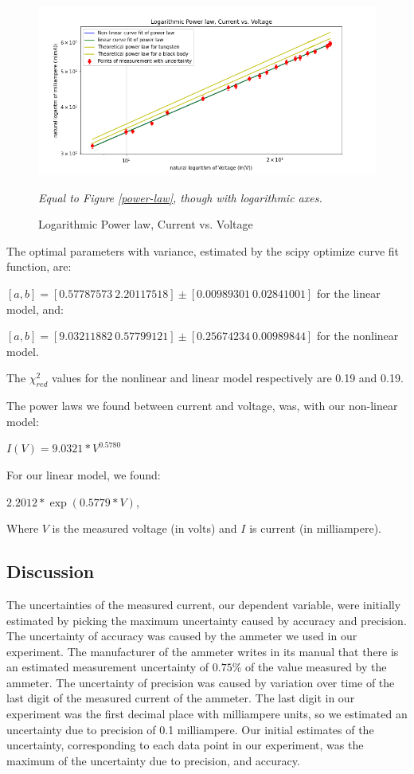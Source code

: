 \documentclass[letterpaper,12pt]{article}
\begin{document}
\begin{figure}[H]
  \centering
  \includegraphics[width=0.95\linewidth]{../Exercise3/Log_Power_law.png}   
  \begin{center} 
    \emph{Equal to Figure \ref{power-law}, though with logarithmic axes.}
  \end{center}
  \caption{Logarithmic Power law, Current vs. Voltage}
  \label{power-law-log}
\end{figure}

The optimal parameters with variance, estimated by the scipy optimize curve fit function, are: 

$[a,b] = [0.57787573\ 2.20117518] \pm [0.00989301\ 0.02841001]$  for the linear model, and: 

$[a,b] = [9.03211882\ 0.57799121] \pm [0.25674234\ 0.00989844]$ for the nonlinear model.

The $\chi^2_{red}$ values for the nonlinear and linear model respectively are 0.19 and 0.19.

The power laws we found between current and voltage, was, with our non-linear model: 

$I(V)= 9.0321 * V ^ {0.5780} $

For our linear model, we found:  

$2.2012 * \exp( 0.5779 * V )$,

Where $V$ is the measured voltage (in volts) and $I$ is current (in milliampere).

\subsection{Discussion}

The uncertainties of the measured current, our dependent variable, 
were initially estimated by picking the maximum uncertainty caused by accuracy and precision. 
The uncertainty of accuracy was caused by the ammeter we used in our experiment. 
The manufacturer of the ammeter writes in its manual that there is an 
estimated measurement uncertainty of $0.75$\% of the value measured by the ammeter. 
The uncertainty of precision was caused by variation over time of the last digit of 
the measured current of the ammeter. The last digit in our experiment was the first 
decimal place with milliampere units, so we estimated an uncertainty due to precision 
of 0.1 milliampere. Our initial estimates of the uncertainty, corresponding to each
 data point in our experiment, was the maximum of the uncertainty due to precision, and accuracy.
\end{document}
